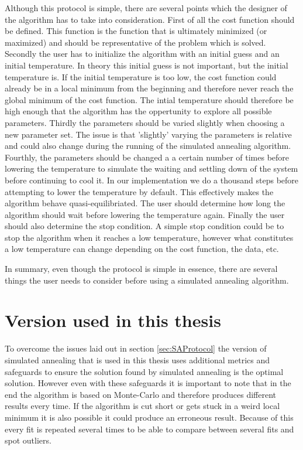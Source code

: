 Although this protocol is simple, there are several points which the designer of the algorithm has to take into consideration. First of all the cost function should be defined. This function is the function that is ultimately minimized (or maximized) and should be representative of the problem which is solved. Secondly the user has to initialize the algorithm with an initial guess and an initial temperature. In theory this initial guess is not important, but the initial temperature is. If the initial temperature is too low, the cost function could already be in a local minimum from the beginning and therefore never reach the global minimum of the cost function. The intial temperature should therefore be high enough that the algorithm has the oppertunity to explore all possible parameters. Thirdly the parameters should be varied slightly when choosing a new parameter set. The issue is that 'slightly' varying the parameters is relative and could also change during the running of the simulated annealing algorithm. Fourthly, the parameters should be changed a a certain number of times before lowering the temperature to simulate the waiting and settling down of the system before continuing to cool it. In our implementation we do a thousand steps before attempting to lower the temperature by default. This effectively makes the algorithm behave quasi-equilibriated. The user should determine how long the algorithm should wait before lowering the temperature again. Finally the user should also determine the stop condition. A simple stop condition could be to stop the algorithm when it reaches a low temperature, however what constitutes a low temperature can change depending on the cost function, the data, etc.

In summary, even though the protocol is simple in essence, there are several things the user needs to consider before using a simulated annealing algorithm.


\section{Version used in this thesis}

To overcome the issues laid out in section \ref{sec:SAProtocol} the version of simulated annealing that is used in this thesis uses additional metrics and safeguards to ensure the solution found by simulated annealing is the optimal solution. However even with these safeguards it is important to note that in the end the algorithm is based on Monte-Carlo and therefore produces different results every time. If the algorithm is cut short or gets stuck in a weird local minimum it is also possible it could produce an erroneous result. Because of this every fit is repeated several times to be able to compare between several fits and spot outliers.

